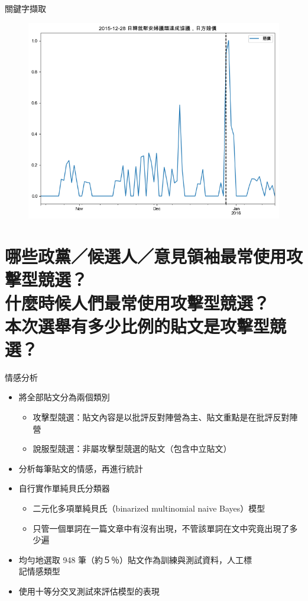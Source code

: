 \documentclass{beamer}
\begin{document}
\begin{CJK}{UTF8}{bkai}
\begin{frame}{關鍵字擷取}
\begin{figure}
  \includegraphics[width=.7\textwidth, height=.7\textheight, keepaspectratio]{ts12}
\end{figure}
\end{frame}

\section{
哪些政黨／候選人／意見領袖最常使用攻擊型競選？\texorpdfstring{\protect\\}{}
\hspace{.35em}什麼時候人們最常使用攻擊型競選？\texorpdfstring{\protect\\}{}
\hspace{.35em}本次選舉有多少比例的貼文是攻擊型競選？
}

\begin{frame}{情感分析}
\begin{itemize}
\item 將全部貼文分為兩個類別
  \begin{itemize}
  \item 攻擊型競選：貼文內容是以批評反對陣營為主、貼文重點是在批評反對陣營
  \item 說服型競選：非屬攻擊型競選的貼文（包含中立貼文）
  \end{itemize}
\item 分析每筆貼文的情感，再進行統計
\item 自行實作單純貝氏分類器
  \begin{itemize}
  \item 二元化多項單純貝氏（binarized multinomial naive Bayes）模型
  \item 只管一個單詞在一篇文章中有沒有出現，不管該單詞在文中究竟出現了多少遍
  \end{itemize}
\item 均勻地選取 948 筆（約５％）貼文作為訓練與測試資料，人工標\\記情感類型
\item 使用十等分交叉測試來評估模型的表現
\end{itemize}
\end{frame}


\end{CJK}
\end{document}
